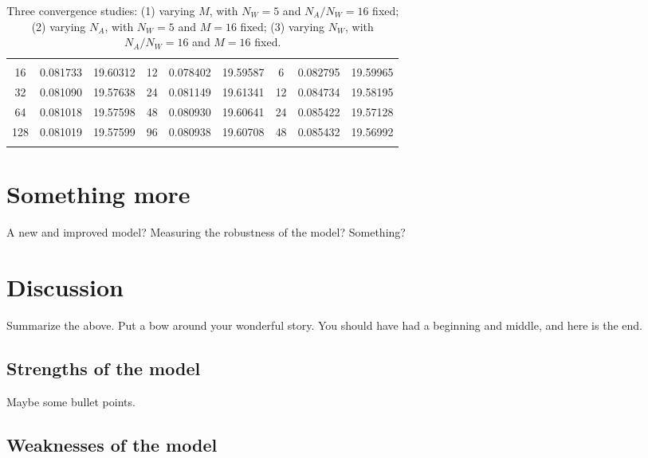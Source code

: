 \documentclass[pre,12pt]{revtex4-1}
\begin{document}
\begin{table}[h]
\label{Convergence}
\centering
\begin{tabular}{@{}CCcCCcCCc@{}}
\toprule
{} &  &  &   &  & &  &  &  \\
\colrule
{} 16 & 0.081733 & 19.60312 & 12 & 0.078402 & 19.59587 &  6 & 0.082795 & 19.59965 \\
32 & 0.081090 & 19.57638 &  24 & 0.081149 & 19.61341 & 12&0.084734 & 19.58195\\
 64 & 0.081018 & 19.57598 &   48 & 0.080930 & 19.60641  & 24&0.085422 & 19.57128\\
128 & 0.081019 & 19.57599 & 96 & 0.080938 & 19.60708 & 48&0.085432 & 19.56992\\
\botrule
\end{tabular}
\caption{Three convergence studies: (1) varying $M$, with $N_{W}=5$ and $N_A/N_{W}=16$ fixed; (2) varying $N_A$, with $N_{W}=5$ and $M=16$ fixed; (3) varying $N_{W}$, with $N_A/N_{W}=16$ and $M=16$ fixed.}
\end{table}



\section{Something more}\label{Something}

A new and improved model? Measuring the robustness of the model? Something? 

\section{Discussion}\label{Discussion}

Summarize the above. Put a bow around your wonderful story. You should have had a beginning and middle, and here is the end. 

\subsection{Strengths of the model}

Maybe some bullet points. 

\subsection{Weaknesses of the model}
\end{document}
